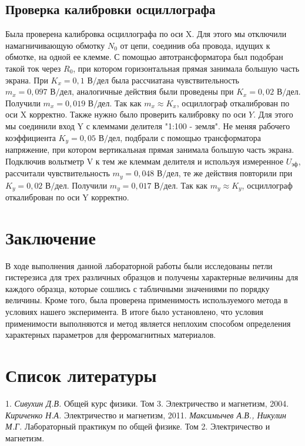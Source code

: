 \subsection*{Проверка калибровки осциллографа}

Была проверена калибровка осциллографа по оси X. Для этого мы отключили намагничивающую обмотку $N_0$ от цепи, соединив оба провода, идущих к обмотке, на одной ее клемме. С помощью автотрансформатора был подобран такой ток через $R_0$, при котором горизонтальная прямая занимала большую часть экрана. При $ K_x=0,1 \text{ В/дел} $ была рассчиатана чувствительность $m_x=0,097 \text{ В/дел}$, аналогичные действия были проведены при $ K_x =0,02 \text{ В/дел} $. Получили $ m_x=0,019 \text{ В/дел} $.
\n\n
Так как $m_x \approx K_x$, осциллограф откалиброван по оси X корректно.
\n\n
Также нужно было проверить калибровку по оси $ Y $. Для этого мы соединили вход Y с клеммами делителя "1:100 - земля". Не меняя рабочего коэффициента $K_y = 0,05\text{ В/дел}$, подбрали с помощью трансформатора напряжение, при котором вертикальная прямая занимала большую часть экрана. Подключив вольтметр V к тем же клеммам делителя и используя измеренное $U_{\text{эф}}$, рассчитали чувствительность $m_y=0,048\text{ В/дел}$, те же действия повторили при $K_y = 0,02\text{ В/дел}$. Получили $m_y=0,017\text{ В/дел}$.
\n\n
Так как $m_y \approx K_y$, осциллограф откалиброван по оси Y корректно.

\section*{Заключение}
В ходе выполнения данной лабораторной работы были исследованы петли гистерезиса для трех различных образцов и получены характерные величины для каждого образца, которые сошлись с табличными значениями по порядку величины. Кроме того, была проверена применимость используемого метода в условиях нашего эксперимента. В итоге было установлено, что условия применимости выполняются и метод является неплохим способом определения характерных параметров для ферромагнитных материалов.

\section*{Список литературы}
1. \textit{Сивухин Д.В.} Общей курс физики. Том 3. Электричество и магнетизм, 2004. \textit{Кириченко Н.А.} Электричество и магнетизм, 2011. \textit{Максимычев А.В., Никулин М.Г.} Лабораторный практикум по общей физике. Том 2. Электричество и магнетизм.

